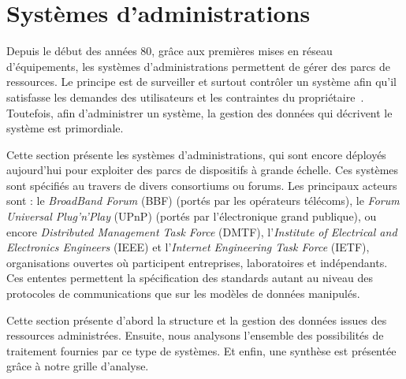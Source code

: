 \section{Systèmes d'administrations}\label{sec:rw:supervision:administration}
Depuis le début des années 80, grâce aux premières mises en réseau d'équipements, les systèmes d'administrations permettent de gérer des parcs de ressources. Le principe est de surveiller et surtout contrôler un système afin qu'il satisfasse les demandes des utilisateurs et les contraintes du propriétaire~\cite{Sloman:management}. Toutefois, afin d'administrer un système, la gestion des données qui décrivent le système est primordiale.

Cette section présente les systèmes d'administrations, qui sont encore déployés aujourd'hui pour exploiter des parcs de dispositifs à grande échelle. Ces systèmes sont spécifiés au travers de divers consortiums ou forums. Les principaux acteurs sont : le \textit{BroadBand Forum} (BBF) (portés par les opérateurs télécoms), le \textit{Forum Universal Plug'n'Play} (UPnP) (portés par l'électronique grand publique), ou encore \textit{Distributed Management Task Force} (DMTF), l'\textit{Institute of Electrical and Electronics Engineers} (IEEE) et l'\textit{Internet Engineering Task Force} (IETF), organisations ouvertes où participent entreprises, laboratoires et indépendants. Ces ententes permettent la spécification des standards autant au niveau des protocoles de communications que sur les modèles de données manipulés.

Cette section présente d'abord la structure et la gestion des données issues des ressources administrées. Ensuite, nous analysons l'ensemble des possibilités de traitement fournies par ce type de systèmes. Et enfin, une synthèse est présentée grâce à notre grille d'analyse.
